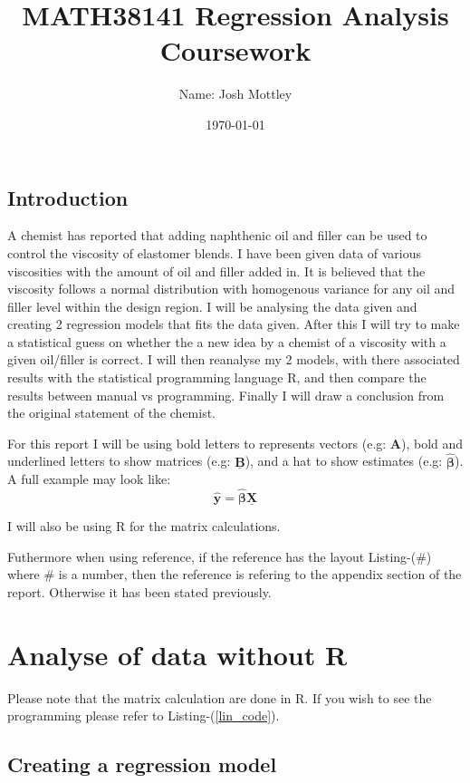 \documentclass[12pt]{article}
\title{MATH38141 Regression Analysis Coursework}
\author{Name: Josh Mottley}
\date{\today}
\newcommand{\vect}[1]{\boldsymbol{#1}}
\newcommand{\mat}[1]{\underline{\boldsymbol{#1}}}
\newcommand{\est}[1]{\hat{#1}}
\begin{document}
\begin{titlepage}
\maketitle

\section*{Introduction}
A chemist has reported that adding naphthenic oil and filler can be used to control the viscosity of elastomer blends. I have been given data of various viscosities with the amount of oil and filler added in. It is believed that the viscosity follows a normal distribution with homogenous variance for any oil and filler level within the design region. I will be analysing the data given and creating 2 regression models that fits the data given. After this I will try to make a statistical guess on whether the a new idea by a chemist of a viscosity with a given oil/filler is correct.
I will then reanalyse my 2 models, with there associated results with the statistical programming language R, and then compare the results between manual vs programming. Finally I will draw a conclusion from the original statement of the chemist. \par

For this report I will be using bold letters to represents vectors (e.g: $\vect{A}$), bold and underlined letters to show matrices (e.g: $\mat{B}$), and a hat to show estimates (e.g: $\est{\vect{\beta}}$). A full example may look like:
\begin{equation*}
\est{\vect{y}}=\est{\vect{\beta}}\mat{X}
\end{equation*} \par
I will also be using R for the matrix calculations.

Futhermore when using reference, if the reference has the layout Listing-(\#) where \# is a number, then the reference is refering to the appendix section of the report. Otherwise it has been stated previously.
\vfill
\end{titlepage}

\section{Analyse of data without R}
Please note that the matrix calculation are done in R. If you wish to see the programming please refer to Listing-(\ref{lin_code}).
\subsection{Creating a regression model}
\end{document}
